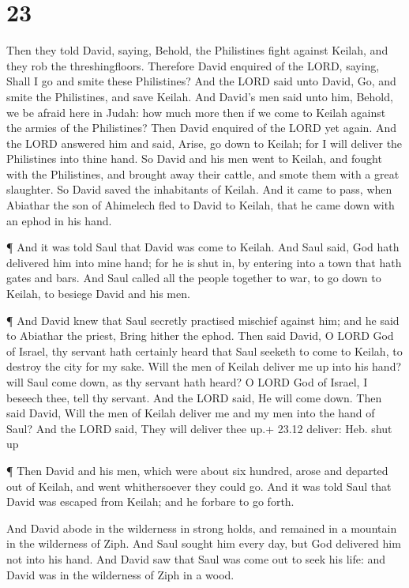 \hypertarget{section-22}{%
\section{23}\label{section-22}}

 Then they told David, saying, Behold, the Philistines fight
against Keilah, and they rob the threshingfloors.  Therefore
David enquired of the LORD, saying, Shall I go and smite these
Philistines? And the LORD said unto David, Go, and smite the
Philistines, and save Keilah.  And David's men said unto
him, Behold, we be afraid here in Judah: how much more then if we come
to Keilah against the armies of the Philistines?  Then David
enquired of the LORD yet again. And the LORD answered him and said,
Arise, go down to Keilah; for I will deliver the Philistines into thine
hand.  So David and his men went to Keilah, and fought with
the Philistines, and brought away their cattle, and smote them with a
great slaughter. So David saved the inhabitants of Keilah. 
And it came to pass, when Abiathar the son of Ahimelech fled to David to
Keilah, that he came down with an ephod in his hand.

 ¶ And it was told Saul that David was come to Keilah. And
Saul said, God hath delivered him into mine hand; for he is shut in, by
entering into a town that hath gates and bars.  And Saul
called all the people together to war, to go down to Keilah, to besiege
David and his men.

 ¶ And David knew that Saul secretly practised mischief
against him; and he said to Abiathar the priest, Bring hither the ephod.
 Then said David, O LORD God of Israel, thy servant hath
certainly heard that Saul seeketh to come to Keilah, to destroy the city
for my sake.  Will the men of Keilah deliver me up into his
hand? will Saul come down, as thy servant hath heard? O LORD God of
Israel, I beseech thee, tell thy servant. And the LORD said, He will
come down.  Then said David, Will the men of Keilah deliver
me and my men into the hand of Saul? And the LORD said, They will
deliver thee up.+ 23.12 deliver: Heb. shut up

 ¶ Then David and his men, which were about six hundred,
arose and departed out of Keilah, and went whithersoever they could go.
And it was told Saul that David was escaped from Keilah; and he forbare
to go forth.

 And David abode in the wilderness in strong holds, and
remained in a mountain in the wilderness of Ziph. And Saul sought him
every day, but God delivered him not into his hand.  And
David saw that Saul was come out to seek his life: and David was in the
wilderness of Ziph in a wood.

